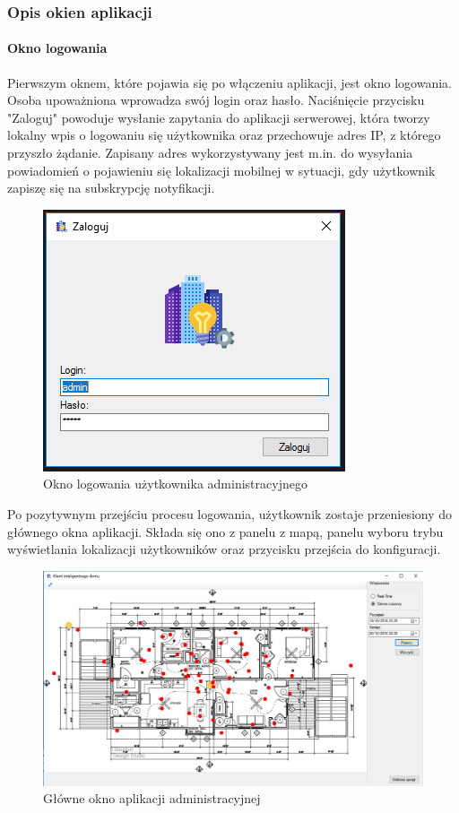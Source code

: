 \documentclass{article}
\begin{document}
		\subsubsection{Opis okien aplikacji}
		\paragraph{Okno logowania}
		Pierwszym oknem, które pojawia się po włączeniu aplikacji, jest okno logowania. Osoba upoważniona wprowadza swój login oraz hasło. Naciśnięcie przycisku "Zaloguj" powoduje wysłanie zapytania do aplikacji serwerowej, która tworzy lokalny wpis o logowaniu się użytkownika oraz przechowuje adres IP, z którego przyszło żądanie. Zapisany adres wykorzystywany jest m.in. do wysyłania powiadomień o pojawieniu się lokalizacji mobilnej w sytuacji, gdy użytkownik zapiszę się na subskrypcję notyfikacji.\\
		\begin{figure}[H]			
			\centering
			\caption{Okno logowania użytkownika administracyjnego}
			\includegraphics{okno_logowania}
		\end{figure}
		Po pozytywnym przejściu procesu logowania, użytkownik zostaje przeniesiony do głównego okna aplikacji. Składa się ono z panelu z mapą, panelu wyboru trybu wyświetlania lokalizacji użytkowników oraz przycisku przejścia do konfiguracji.\\
		\begin{figure}[H]			
			\centering
			\caption{Główne okno aplikacji administracyjnej}
			\includegraphics[width=1.0\textwidth]{okno_glowne}
		\end{figure}
\end{document}
